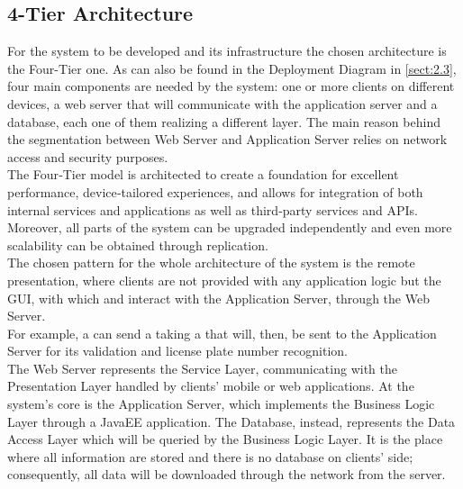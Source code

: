\documentclass[../../../DD.tex]{subfiles}
\begin{document}
	
	\subsection{4-Tier Architecture\label{subsect:2.6.1}}
	For the system to be developed and its infrastructure the chosen architecture is the Four-Tier one. As can also be found in the Deployment Diagram in \ref{sect:2.3}, four main components are needed by the system: one or more clients on different devices, a web server that will communicate with the application server and a database, each one of them realizing a different layer. The main reason behind the segmentation between Web Server and Application Server relies on network access and security purposes.\\
	The Four‑Tier model is architected to create a foundation for excellent performance, device‑tailored experiences, and allows for integration of both internal services and applications as well as third‑party services and APIs. Moreover, all parts of the system can be upgraded independently and even more scalability can be obtained through replication. \\
	
	The chosen pattern for the whole architecture of the system is the remote presentation, where clients are not provided with any application logic but the GUI, with which  and  interact with the Application Server, through the Web Server. \\
	For example, a  can send a  taking a  that will, then, be sent to the Application Server for its validation and license plate number recognition. \\
	
	The Web Server represents the Service Layer, communicating with the Presentation Layer handled by clients' mobile or web applications. At the system's core is the Application Server, which implements the Business Logic Layer through a JavaEE application. The Database, instead, represents the Data Access Layer which will be queried by the Business Logic Layer. It is the place where all information are stored and there is no database on clients' side; consequently, all data will be downloaded through the network from the server.
	
\end{document}
